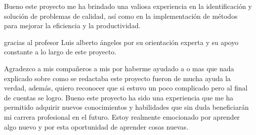     Bueno este proyecto me ha brindado una valiosa experiencia en la identificación y solución de problemas de calidad, así como en la implementación de métodos para mejorar la eficiencia y la productividad.
    
    gracias al profesor Luis alberto ángeles por su orientación experta y su apoyo constante a lo largo de este proyecto.
    
    Agradezco a mis compañeros a mis por haberme ayudado a 
     o mas que nada explicado sobre como se redactaba este proyecto fueron de mucha ayuda la verdad, además, quiero reconocer que si estuvo un poco complicado pero al final de cuentas se logro. Bueno este proyecto ha sido una experiencia que me ha permitido adquirir nuevos conocimientos y habilidades que sin duda beneficiarán mi carrera profesional en el futuro. Estoy realmente emocionado por aprender algo nuevo y por esta oportunidad de aprender cosas nuevas.
    
    
    
